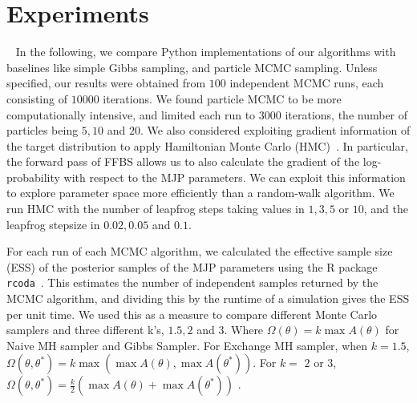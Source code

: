 
\section{Experiments}~
In the following, we compare Python implementations of our algorithms with baselines like simple Gibbs sampling, 
and particle MCMC sampling. Unless specified, our results were
obtained from $100$ independent MCMC runs, each consisting of $10000$ iterations.
We found particle MCMC to be more computationally intensive, and limited each 
run to $3000$ iterations, the number of particles being $5, 10$ and $20$. 
We also considered exploiting gradient information of the target distribution to 
apply Hamiltonian Monte Carlo (HMC)~\cite{Neal2010}. In particular, the forward 
pass of FFBS allows us to also calculate the gradient of the log-probability with
respect to the MJP parameters. We can exploit this information to explore parameter
space more efficiently than a random-walk algorithm. We run HMC with the number of leapfrog steps taking values in $1, 3, 5$ or $10$, and the leapfrog stepsize in 
$0.02, 0.05$ and $0.1$. 

For each run of each MCMC algorithm, we calculated the effective sample size (ESS) of the posterior samples of the MJP parameters using the R 
package \texttt{rcoda}~\cite{Rcoda2006}. This estimates the number of independent samples returned by the MCMC algorithm,
and dividing this by the runtime of a 
simulation gives the ESS per unit time. We used this as a measure to compare different Monte Carlo samplers and three different k's, $1.5, 2$ and $3$. Where $\Omega(\theta) = k \max A(\theta) $ for Naive MH sampler and Gibbs Sampler. For Exchange MH sampler, when $k = 1.5$,  $\Omega(\theta, \theta^*) = k \max(\max A(\theta), \max A(\theta^*))$. For $k=$ $2$ or $3$, $\Omega(\theta, \theta^*) = \frac{k}{2} (\max A(\theta) + \max A(\theta^*))$  . 

